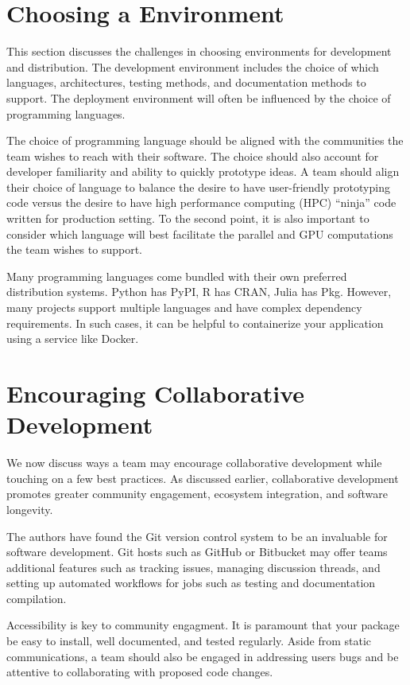 \documentclass[graybox]{svmult}
\begin{document}
\section{Choosing a Environment} \label{CDHS_sec:language_library_environment}

This section discusses the challenges in choosing environments for development and distribution. The development environment includes the choice of which languages, architectures, testing methods, and documentation methods to support. The deployment environment will often be influenced by the choice of programming languages.

The choice of programming language should be aligned with the communities the team wishes to reach with their software. The choice should also account for developer familiarity and ability to quickly prototype ideas. A team should align their choice of language to balance the desire to have user-friendly prototyping code versus the desire to have high performance computing (HPC) ``ninja'' code written for production setting. To the second point, it is also important to consider which language will best facilitate the parallel and GPU computations the team wishes to support.

Many programming languages come bundled with their own preferred distribution systems. Python has PyPI, R has CRAN, Julia has Pkg. However, many projects support multiple languages and have complex dependency requirements. In such cases, it can be helpful to containerize your application using a service like Docker.

\section{Encouraging Collaborative Development} \label{CDHS_sec:encouraging_collaborative_developement}

We now discuss ways a team may encourage collaborative development while touching on a few best practices. As discussed earlier, collaborative development promotes greater community engagement, ecosystem integration, and software longevity.

The authors have found the Git version control system to be an invaluable for software development. Git hosts such as GitHub or Bitbucket may offer teams additional features such as tracking issues, managing discussion threads, and setting up automated workflows for jobs such as testing and documentation compilation.

Accessibility is key to community engagment. It is paramount that your package be easy to install, well documented, and tested regularly. Aside from static communications, a team should also be engaged in addressing users bugs and be attentive to collaborating with proposed code changes.
\end{document}
